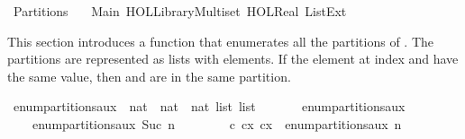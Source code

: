 %
\begin{isabellebody}%
%
%
\isadelimdocument
%
\endisadelimdocument
%
\isatagdocument
%
\isamarkuptrue%
%
\endisatagdocument
{\isafolddocument}%
%
\isadelimdocument
%
\endisadelimdocument
%
\isadelimtheory
%
\endisadelimtheory
%
\isatagtheory
{}\isamarkupfalse%
\ Partitions\isanewline
\ \ \ Main\ {\isachardoublequoteopen}HOL{\isacharminus}{\kern0pt}Library{\isachardot}{\kern0pt}Multiset{\isachardoublequoteclose}\ {\isachardoublequoteopen}HOL{\isachardot}{\kern0pt}Real{\isachardoublequoteclose}\ List{\isacharunderscore}{\kern0pt}Ext\isanewline
{}%
\endisatagtheory
{\isafoldtheory}%
%
\isadelimtheory
%
\endisadelimtheory
%
\begin{isamarkuptext}%
This section introduces a function that enumerates all the partitions of
. The partitions are represented as lists with  elements. If the element
at index  and  have the same value, then  and  are in
the same partition.%
\end{isamarkuptext}\isamarkuptrue%
\isamarkupfalse%
\ enum{\isacharunderscore}{\kern0pt}partitions{\isacharunderscore}{\kern0pt}aux\ {\isacharcolon}{\kern0pt}{\isacharcolon}{\kern0pt}\ {\isachardoublequoteopen}nat\ {\isasymRightarrow}\ {\isacharparenleft}{\kern0pt}nat\ {\isasymtimes}\ nat\ list{\isacharparenright}{\kern0pt}\ list{\isachardoublequoteclose}\isanewline
\ \ \isanewline
\ \ \ \ {\isachardoublequoteopen}enum{\isacharunderscore}{\kern0pt}partitions{\isacharunderscore}{\kern0pt}aux\ {}\ {\isacharequal}{\kern0pt}\ {\isacharbrackleft}{\kern0pt}{\isacharparenleft}{\kern0pt}{}{\isacharcomma}{\kern0pt}\ {\isacharbrackleft}{\kern0pt}{\isacharbrackright}{\kern0pt}{\isacharparenright}{\kern0pt}{\isacharbrackright}{\kern0pt}{\isachardoublequoteclose}\ {\isacharbar}{\kern0pt}\isanewline
\ \ \ \ {\isachardoublequoteopen}enum{\isacharunderscore}{\kern0pt}partitions{\isacharunderscore}{\kern0pt}aux\ {\isacharparenleft}{\kern0pt}Suc\ n{\isacharparenright}{\kern0pt}\ {\isacharequal}{\kern0pt}\ \isanewline
\ \ \ \ \ \ {\isacharbrackleft}{\kern0pt}{\isacharparenleft}{\kern0pt}c{\isacharplus}{\kern0pt}{}{\isacharcomma}{\kern0pt}\ c{\isacharhash}{\kern0pt}x{\isacharparenright}{\kern0pt}{\isachardot}{\kern0pt}\ {\isacharparenleft}{\kern0pt}c{\isacharcomma}{\kern0pt}x{\isacharparenright}{\kern0pt}\ {\isasymleftarrow}\ enum{\isacharunderscore}{\kern0pt}partitions{\isacharunderscore}{\kern0pt}aux\ n{\isacharbrackright}{\kern0pt}{\isacharat}{\kern0pt}\isanewline

\end{isabellebody}
